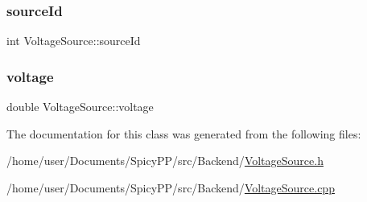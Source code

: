 \mbox{\label{classVoltageSource_a34411acea2cb7d017e1b5c0b826d69a6}} 
\subsubsection{\texorpdfstring{source\+Id}{sourceId}}
{\footnotesize\ttfamily int Voltage\+Source\+::source\+Id\hspace{0.3cm}{\ttfamily [private]}}

\mbox{\label{classVoltageSource_a1bd00b28cadd7f5b0faa58fd33bceee9}} 
\subsubsection{\texorpdfstring{voltage}{voltage}}
{\footnotesize\ttfamily double Voltage\+Source\+::voltage\hspace{0.3cm}{\ttfamily [private]}}



The documentation for this class was generated from the following files\+:\begin{DoxyCompactItemize}
\item 
/home/user/\+Documents/\+Spicy\+P\+P/src/\+Backend/\hyperlink{VoltageSource_8h}{Voltage\+Source.\+h}\item 
/home/user/\+Documents/\+Spicy\+P\+P/src/\+Backend/\hyperlink{VoltageSource_8cpp}{Voltage\+Source.\+cpp}\end{DoxyCompactItemize}
